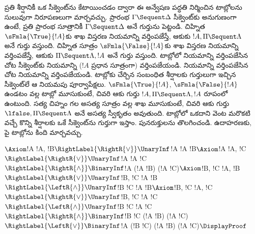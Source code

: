 \documentclass[../../../include/open-logic-section]{subfiles}
\begin{document}
ప్రతి శీర్షానికీ ఒక సీక్వెంట్‌ను కేటాయించడం ద్వారా ఈ అన్వేషణ పద్ధతి
నిర్మించిన టాబ్లోలను సులువుగా  నిరూపణలుగా మార్చవచ్చు.
ప్రారంభ  $\Gamma \Sequent \Delta$ సీక్వెంట్‌కు అనుగుణంగా ఉంటే,
ప్రతి ప్రారంభ సూత్రానికీ $\Gamma \Sequent \Delta$ అనే గుర్తును
పెట్టండి. చిహ్నిత  $\sFmla{\True}{!A}$కు
శాఖ విస్తరణ నియమాన్ని వర్తింపజేస్తే, ఆకుకు $!A, \Pi \Sequent \Lambda$ అనే గుర్తు వస్తుంది.
చిహ్నిత సూత్రం $\sFmla{\False}{!A}$కు శాఖ విస్తరణ నియమాన్ని వర్తింపజేస్తే,
ఆకుకు $\Pi \Sequent \Lambda, !A$ అనే గుర్తు వస్తుంది. టాబ్లోలో \TRule{\True}{\star}
నియమాన్ని వర్తింపజేసిన చోట సీక్వెంట్‌కు \LeftR{\star} నియమాన్ని
($!A$ ప్రధాన సూత్రంగా) వర్తింపజేయండి. \TRule{\False}{\star}
నియమాన్ని వర్తింపజేసిన చోట \RightR{\star} నియమాన్ని వర్తింపజేయండి.
టాబ్లోకు చేర్చిన సంబంధిత శీర్షాలకు గుర్తులుగా ఇచ్చిన సీక్వెంట్‌లే ఆ నియమపు
పూర్వాపేక్షలు. $\sFmla{\True}{!A}$, $\sFmla{\False}{!A}$ ఉండటం వల్ల టాబ్లో
మూసుకుంటే, చివరి ఆకు గుర్తు $!A, \Pi \Sequent \Lambda, !A$
రూపంలో ఉంటుంది. సత్య చిహ్నం గల అసత్య సూత్రం వల్ల శాఖ మూసుకుంటే,
చివరి ఆకు గుర్తు $\lfalse, \Pi \Sequent \Lambda$ అనే అసత్య
స్వీకృతం అవుతుంది. టాబ్లోలో ఒకదాని వెంట మరొకటి వచ్చే కొన్ని శీర్షాలకు ఒకే
సీక్వెంట్‌ను గుర్తుగా ఇస్తాం. పునరుక్తులను తొలగించండి. ఉదాహరణకు,
పై టాబ్లోను కింది  మార్చవచ్చు.

\begin{maxwidth}
$
\Axiom$!A \fCenter !A, !B$
\RightLabel{\RightR{\lor}}
\UnaryInf$!A \fCenter !A \lor !B$
\Axiom$!A \fCenter !A, !C$
\RightLabel{\RightR{\lor}}
\UnaryInf$!A \fCenter !A \lor !C$
\RightLabel{\RightR{\land}}
\BinaryInf$!A \fCenter (!A \lor !B) \land (!A \lor !C)$
\Axiom$!B, !C \fCenter !A, !B$
\RightLabel{\RightR{\lor}}
\UnaryInf$!B, !C \fCenter !A \lor !B$
\RightLabel{\LeftR{\land}}
\UnaryInf$!B \land !C \fCenter !A \lor !B$
\Axiom$!B, !C \fCenter !A, !C$
\RightLabel{\RightR{\lor}}
\UnaryInf$!B, !C \fCenter !A \lor !C$
\RightLabel{\LeftR{\land}}
\UnaryInf$!B \land !C \fCenter !A \lor !C$
\RightLabel{\RightR{\land}}
\BinaryInf$!B \land !C \fCenter (!A \lor !B) \land
(!A \lor !C)$
\RightLabel{\LeftR{\lor}}
\BinaryInf$!A \lor (!B \land !C) \fCenter (!A \lor !B) \land
(!A \lor !C)$
\DisplayProof$
\end{maxwidth}
\end{document}
